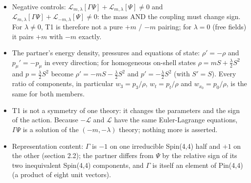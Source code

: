 \documentclass[11pt]{article}
\begin{document}
\begin{itemize}
\item Negative controls: $\mathcal{L}_{m,\lambda}[\Gamma\Psi] + \mathcal{L}_{m,\lambda}[\Psi] \neq 0$ and $\mathcal{L}_{m,\lambda}[\Gamma\Psi] + \mathcal{L}_{-m,\lambda}[\Psi] \neq 0$: the mass AND the coupling must change sign. For $\lambda \neq 0$, T1 is therefore not a pure $+m$ / $-m$ pairing; for $\lambda = 0$ (free fields) it pairs $+m$ with $-m$ exactly.
\item The partner's energy density, pressures and equations of state: $\rho' = -\rho$ and $p_\mu' = -p_\mu$ in every direction; for homogeneous on-shell states $\rho = mS + \frac{\lambda}{2}S^2$ and $p = \frac{\lambda}{2}S^2$ become $\rho' = -mS - \frac{\lambda}{2}S^2$ and $p' = -\frac{\lambda}{2}S^2$ (with $S' = S$). Every ratio of components, in particular $w_3 = p_3/\rho$, $w_t = p_t/\rho$ and $w_{x_0} = p_0/\rho$, is the same for both members.
\item T1 is not a symmetry of one theory: it changes the parameters and the sign of the action. Because $-\mathcal{L}$ and $\mathcal{L}$ have the same Euler-Lagrange equations, $\Gamma\Psi$ is a solution of the $(-m,-\lambda)$ theory; nothing more is asserted.
\item Representation content: $\Gamma$ is $-1$ on one irreducible Spin(4,4) half and $+1$ on the other (section 2.2); the partner differs from $\Psi$ by the relative sign of its two inequivalent Spin(4,4) components, and $\Gamma$ is itself an element of Pin(4,4) (a product of eight unit vectors).
\end{itemize}
\end{document}
